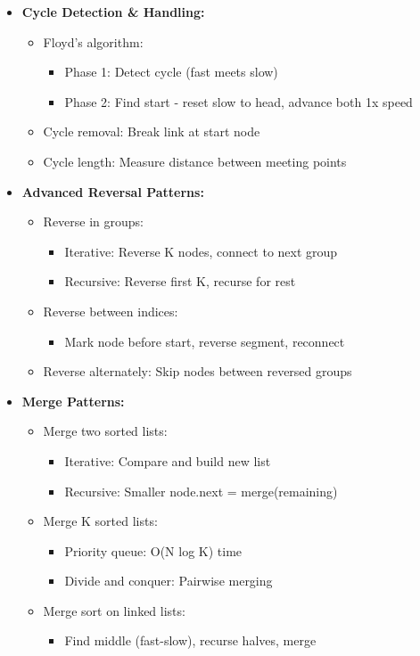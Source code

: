 \documentclass[a4paper,10pt]{book}
\begin{document}
\begin{itemize}
    \item \textbf{Cycle Detection \& Handling:}
    \begin{itemize}
        \item Floyd's algorithm:
        \begin{itemize}
            \item Phase 1: Detect cycle (fast meets slow)
            \item Phase 2: Find start - reset slow to head, advance both 1x speed
        \end{itemize}
        \item Cycle removal: Break link at start node
        \item Cycle length: Measure distance between meeting points
    \end{itemize}
    
    \item \textbf{Advanced Reversal Patterns:}
    \begin{itemize}
        \item Reverse in groups:
        \begin{itemize}
            \item Iterative: Reverse K nodes, connect to next group
            \item Recursive: Reverse first K, recurse for rest
        \end{itemize}
        \item Reverse between indices:
        \begin{itemize}
            \item Mark node before start, reverse segment, reconnect
        \end{itemize}
        \item Reverse alternately: Skip nodes between reversed groups
    \end{itemize}
    
    \item \textbf{Merge Patterns:}
    \begin{itemize}
        \item Merge two sorted lists:
        \begin{itemize}
            \item Iterative: Compare and build new list
            \item Recursive: Smaller node.next = merge(remaining)
        \end{itemize}
        \item Merge K sorted lists:
        \begin{itemize}
            \item Priority queue: O(N log K) time
            \item Divide and conquer: Pairwise merging
        \end{itemize}
        \item Merge sort on linked lists:
        \begin{itemize}
            \item Find middle (fast-slow), recurse halves, merge
        \end{itemize}
    \end{itemize}
    

\end{itemize}
\end{document}
